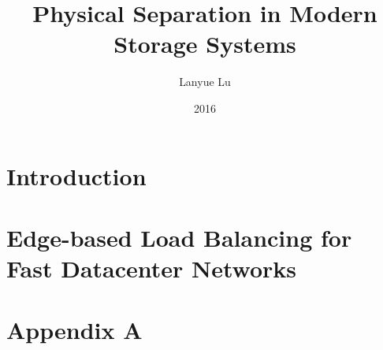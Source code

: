 \documentclass[12pt, letterpaper, oldfontcommands]{memoir}
\title{Physical Separation in Modern Storage Systems}
\author{Lanyue Lu}
\date{2016 \vspace{-1in}}
\begin{document}

\ifdef{\ShortenThesis}{
}{
  
}

\chapter{Introduction}
\label{thesis:chapter:intro}


\chapter{Edge-based Load Balancing for Fast Datacenter Networks}
\label{thesis:chapter:presto}


%
%
%
%










\begin{appendices}

%
\end{appendices}



\appendix

\chapter{Appendix A}


\fi
\end{document}
